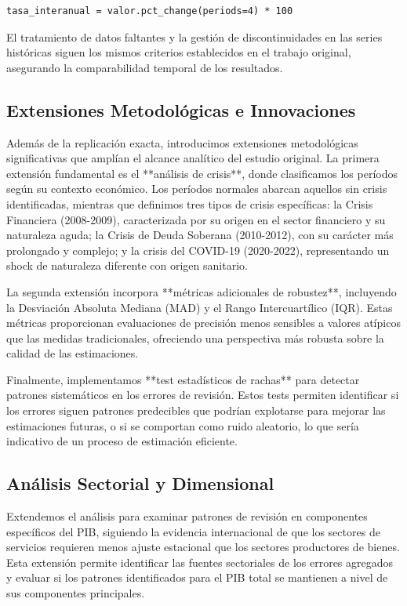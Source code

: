 \documentclass{article}
\begin{document}
\begin{verbatim}
tasa_interanual = valor.pct_change(periods=4) * 100
\end{verbatim}

El tratamiento de datos faltantes y la gestión de discontinuidades en las series históricas siguen los mismos criterios establecidos en el trabajo original, asegurando la comparabilidad temporal de los resultados.

\subsection{Extensiones Metodológicas e Innovaciones}

Además de la replicación exacta, introducimos extensiones metodológicas significativas que amplían el alcance analítico del estudio original. La primera extensión fundamental es el **análisis de crisis**, donde clasificamos los períodos según su contexto económico. Los períodos normales abarcan aquellos sin crisis identificadas, mientras que definimos tres tipos de crisis específicas: la Crisis Financiera (2008-2009), caracterizada por su origen en el sector financiero y su naturaleza aguda; la Crisis de Deuda Soberana (2010-2012), con su carácter más prolongado y complejo; y la crisis del COVID-19 (2020-2022), representando un shock de naturaleza diferente con origen sanitario.

La segunda extensión incorpora **métricas adicionales de robustez**, incluyendo la Desviación Absoluta Mediana (MAD) y el Rango Intercuartílico (IQR). Estas métricas proporcionan evaluaciones de precisión menos sensibles a valores atípicos que las medidas tradicionales, ofreciendo una perspectiva más robusta sobre la calidad de las estimaciones.

Finalmente, implementamos **test estadísticos de rachas** para detectar patrones sistemáticos en los errores de revisión. Estos tests permiten identificar si los errores siguen patrones predecibles que podrían explotarse para mejorar las estimaciones futuras, o si se comportan como ruido aleatorio, lo que sería indicativo de un proceso de estimación eficiente.

\subsection{Análisis Sectorial y Dimensional}

Extendemos el análisis para examinar patrones de revisión en componentes específicos del PIB, siguiendo la evidencia internacional de que los sectores de servicios requieren menos ajuste estacional que los sectores productores de bienes. Esta extensión permite identificar las fuentes sectoriales de los errores agregados y evaluar si los patrones identificados para el PIB total se mantienen a nivel de sus componentes principales.
\end{document}
